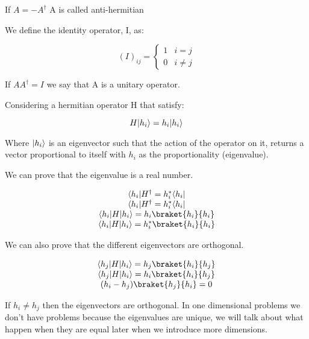 If $A=-A^{\dagger}$ A is called anti-hermitian

We define the identity operator, I, as:

\begin{equation}
  (I)_{ij} = \left\{
  \begin{array}{lc}
    1 & i=j
    \\
    0 & i \neq j
  \end{array}
  \right.
\end{equation}

If $A A^{\dagger} = I$ we say that A is a unitary operator.

Considering a hermitian operator H that satisfy:

\begin{equation}
  H\lvert h_i\rangle = h_i \lvert h_i\rangle
\end{equation}

Where $\lvert h_i\rangle$ is an eigenvector such that the action of the operator on it, returns a vector proportional to itself with $h_i$ as the proportionality (eigenvalue).

We can prove that the eigenvalue is a real number.

\begin{equation}
  \begin{array}{c}
    \bra{h_i}H^{\dagger} = h_i^* \bra{h_i}
    \\
    \bra{h_i}H^{\dagger} = h_i^* \bra{h_i}
    \\
    \bra{h_i}H\ket{h_i} = h_i \braket{h_i}{h_i}
    \\
    \bra{h_i}H\ket{h_i} = h_i^* \braket{h_i}{h_i}
  \end{array}
\end{equation}

We can also prove that the different eigenvectors are orthogonal.

\begin{equation}
  \begin{array}{c}
    \bra{h_j}H\ket{h_i} = h_j \braket{h_i}{h_j}
    \\
    \bra{h_j}H\ket{h_i} = h_i \braket{h_i}{h_j}
    \\
    (h_i-h_j)\braket{h_j}{h_i} = 0
  \end{array}
\end{equation}

If $h_i\neq h_j$ then the eigenvectors are orthogonal. In one dimensional problems we don't have problems because the eigenvalues are unique, we will talk about what happen when they are equal later when we introduce more dimensions.

